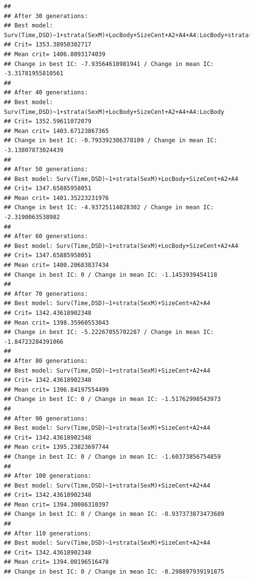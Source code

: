 \documentclass{article}\usepackage[]{graphicx}\usepackage[]{color}
\makeatletter
\newenvironment{kframe}{%
 \def\at@end@of@kframe{}%
 \ifinner\ifhmode%
  \def\at@end@of@kframe{\end{minipage}}%
  \begin{minipage}{\columnwidth}%
 \fi\fi%
 \def\FrameCommand##1{\hskip\@totalleftmargin \hskip-\fboxsep
 \colorbox{shadecolor}{##1}\hskip-\fboxsep
     \hskip-\linewidth \hskip-\@totalleftmargin \hskip\columnwidth}%
 \MakeFramed {\advance\hsize-\width
   \@totalleftmargin\z@ \linewidth\hsize
   \@setminipage}}%
 {\par\unskip\endMakeFramed%
 \at@end@of@kframe}
\newenvironment{knitrout}{}{} %
\makeatother
\begin{document}
\begin{knitrout}
\begin{kframe}
{\ttfamily\noindent\color{warningcolor}{\#\# Warning in fitter(X, Y, strats, offset, init, control, weights = weights, : Loglik converged before variable\ \ 11 ; beta may be infinite.}}\begin{verbatim}
## 
## After 30 generations:
## Best model: Surv(Time,DSD)~1+strata(SexM)+LocBody+SizeCent+A2+A4+A4:LocBody+strata(SexM):SizeCent
## Crit= 1353.38950302717
## Mean crit= 1406.8093174039
## Change in best IC: -7.93564618981941 / Change in mean IC: -3.31781955810561
## 
## After 40 generations:
## Best model: Surv(Time,DSD)~1+strata(SexM)+LocBody+SizeCent+A2+A4+A4:LocBody
## Crit= 1352.59611072079
## Mean crit= 1403.67123867365
## Change in best IC: -0.793392306378109 / Change in mean IC: -3.13807873024439
## 
## After 50 generations:
## Best model: Surv(Time,DSD)~1+strata(SexM)+LocBody+SizeCent+A2+A4
## Crit= 1347.65885958051
## Mean crit= 1401.35223231976
## Change in best IC: -4.93725114028302 / Change in mean IC: -2.3190063538982
## 
## After 60 generations:
## Best model: Surv(Time,DSD)~1+strata(SexM)+LocBody+SizeCent+A2+A4
## Crit= 1347.65885958051
## Mean crit= 1400.20683837434
## Change in best IC: 0 / Change in mean IC: -1.1453939454118
## 
## After 70 generations:
## Best model: Surv(Time,DSD)~1+strata(SexM)+SizeCent+A2+A4
## Crit= 1342.43618902348
## Mean crit= 1398.35960553043
## Change in best IC: -5.22267055702287 / Change in mean IC: -1.84723284391066
## 
## After 80 generations:
## Best model: Surv(Time,DSD)~1+strata(SexM)+SizeCent+A2+A4
## Crit= 1342.43618902348
## Mean crit= 1396.84197554499
## Change in best IC: 0 / Change in mean IC: -1.51762998543973
## 
## After 90 generations:
## Best model: Surv(Time,DSD)~1+strata(SexM)+SizeCent+A2+A4
## Crit= 1342.43618902348
## Mean crit= 1395.23823697744
## Change in best IC: 0 / Change in mean IC: -1.60373856754859
## 
## After 100 generations:
## Best model: Surv(Time,DSD)~1+strata(SexM)+SizeCent+A2+A4
## Crit= 1342.43618902348
## Mean crit= 1394.30086310397
## Change in best IC: 0 / Change in mean IC: -0.937373873473689
## 
## After 110 generations:
## Best model: Surv(Time,DSD)~1+strata(SexM)+SizeCent+A2+A4
## Crit= 1342.43618902348
## Mean crit= 1394.00196516478
## Change in best IC: 0 / Change in mean IC: -0.298897939191875
\end{verbatim}



\end{kframe}
\end{knitrout}
\end{document}
